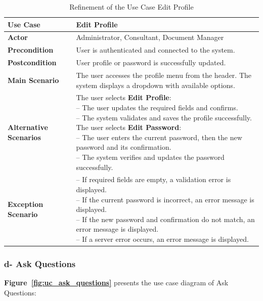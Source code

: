 \begin{table}[H]
\centering
\caption{Refinement of the Use Case Edit Profile}
\label{tab:ref_edit_profile}
\begin{tabular}{|>{\centering\arraybackslash}p{4cm}|p{10cm}|}
\hline
\textbf{Use Case} & Edit Profile \\ \hline
\textbf{Actor} & Administrator, Consultant, Document Manager \\ \hline
\textbf{Precondition} & User is authenticated and connected to the system. \\ \hline
\textbf{Postcondition} & User profile or password is successfully updated. \\ \hline
\textbf{Main Scenario} & The user accesses the profile menu from the header. The system displays a dropdown with available options. \\ \hline
\textbf{Alternative Scenarios} &
\parbox[t]{10cm}{\small\setlength{\parskip}{1pt}
The user selects \textbf{Edit Profile}:\newline
\hspace*{0.2cm}-- The user updates the required fields and confirms.\newline
\hspace*{0.2cm}-- The system validates and saves the profile successfully.\newline
The user selects \textbf{Edit Password}:\newline
\hspace*{0.2cm}-- The user enters the current password, then the new password and its confirmation.\newline
\hspace*{0.2cm}-- The system verifies and updates the password successfully.
}\\ \hline
\textbf{Exception Scenario} &
\parbox[t]{10cm}{\small\setlength{\parskip}{1pt}
-- If required fields are empty, a validation error is displayed.\newline
-- If the current password is incorrect, an error message is displayed.\newline
-- If the new password and confirmation do not match, an error message is displayed.\newline
-- If a server error occurs, an error message is displayed.
}\\ \hline
\end{tabular}
\end{table}

\subsubsection{d- Ask Questions}
\textbf{Figure~\ref{fig:uc_ask_questions}} presents the use case diagram of Ask Questions:

